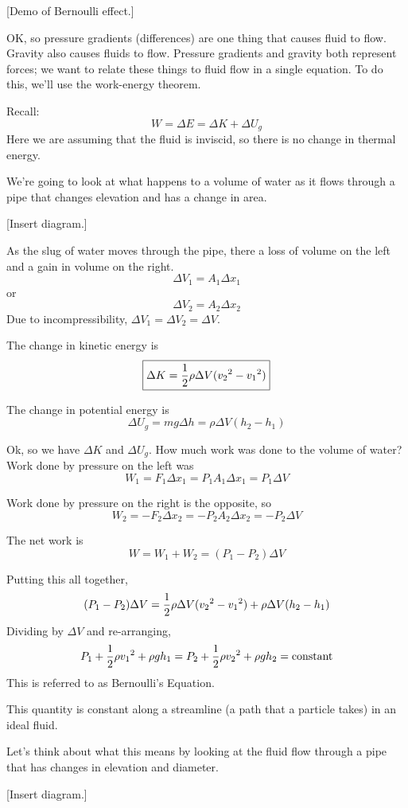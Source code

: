 [Demo of Bernoulli effect.]

OK, so pressure gradients (differences) are one thing that causes fluid to flow. Gravity also causes fluids to flow. Pressure gradients and gravity both represent forces; we want to relate these things to fluid flow in a single equation. To do this, we'll use the work-energy theorem.

Recall:
$$W=\Delta E=\Delta K+\Delta U_g$$
Here we are assuming that the fluid is inviscid, so there is no change in thermal energy.

We're going to look at what happens to a volume of water as it flows through a pipe that changes elevation and has a change in area.

[Insert diagram.]\nopagebreak
\vspace{5cm}

As the slug of water moves through the pipe, there a loss of volume on the left and a gain in volume on the right. 
$$\Delta V_1=A_1\Delta{x_1}$$
or
$$\Delta V_2=A_2\Delta{x_2}$$
Due to incompressibility, $\Delta V_1=\Delta V_2=\Delta V$.

The change in kinetic energy is
$$\boxed{\Delta K=\frac{1}{2}\rho \Delta V(v_2\displaystyle^2-v_1\displaystyle^2)}$$

The change in potential energy is
$$\boxed{\Delta U_g=mg\Delta h=\rho \Delta V(h_2-h_1)}$$

Ok, so we have $\Delta{K}$ and $\Delta{U_g}$. How much work was done to the volume of water? Work done by pressure on the left was
$$W_1=F_1\Delta x_1=P_1A_1\Delta x_1=P_1\Delta V$$

Work done by pressure on the right is the opposite, so
$$W_2=-F_2\Delta x_2=-P_2A_2\Delta x_2=-P_2\Delta V$$

The net work is 
$$\boxed{W=W_1+W_2=(P_1-P_2)\Delta V}$$

Putting this all together,
$$(P_1-P_2)\Delta V=\frac{1}{2}\rho \Delta V(v_2\displaystyle^2-v_1\displaystyle^2)+\rho \Delta V(h_2-h_1)$$
Dividing by $\Delta V$ and re-arranging,
$$P_1+\frac{1}{2}\rho v_1\displaystyle^2+\rho gh_1=P_2+\frac{1}{2}\rho v_2\displaystyle^2+\rho gh_2=\mbox{constant}$$
This is referred to as Bernoulli's Equation.

This quantity is constant along a streamline (a path that a particle takes) in an ideal fluid.

Let's think about what this means by looking at the fluid flow through a pipe that has changes in elevation and diameter.

[Insert diagram.]\nopagebreak
\vspace{8cm}


